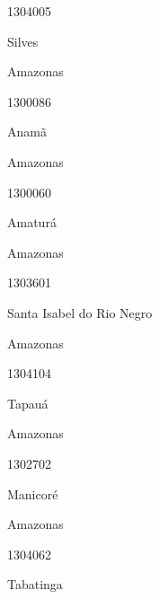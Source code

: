 \documentclass[
  letterpaper,
]{report}
\begin{document}
\n      

1304005

\n      

Silves

\n    

\n    

\n      

Amazonas

\n      

1300086

\n      

Anamã

\n    

\n    

\n      

Amazonas

\n      

1300060

\n      

Amaturá

\n    

\n    

\n      

Amazonas

\n      

1303601

\n      

Santa Isabel do Rio Negro

\n    

\n    

\n      

Amazonas

\n      

1304104

\n      

Tapauá

\n    

\n    

\n      

Amazonas

\n      

1302702

\n      

Manicoré

\n    

\n    

\n      

Amazonas

\n      

1304062

\n      

Tabatinga

\n    
\end{document}
